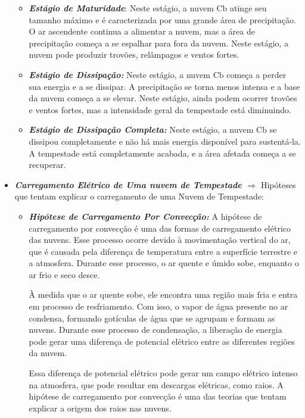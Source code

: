\documentclass[a4paper, 12pt, onecolumn,singlespacing]{article}
\begin{document}
\begin{itemize}
\begin{itemize}
			\item \textbf{\textit{Estágio de Maturidade}}: Neste estágio, a nuvem Cb atinge seu tamanho máximo e é caracterizada por uma grande área de precipitação. O ar ascendente continua a alimentar a nuvem, mas a área de precipitação começa a se espalhar para fora da nuvem. Neste estágio, a nuvem pode produzir trovões, relâmpagos e ventos fortes.
			
			\item \textbf{\textit{Estágio de Dissipação:}} Neste estágio, a nuvem Cb começa a perder sua energia e a se dissipar. A precipitação se torna menos intensa e a base da nuvem começa a se elevar. Neste estágio, ainda podem ocorrer trovões e ventos fortes, mas a intensidade geral da tempestade está diminuindo.
			
			\item \textbf{\textit{Estágio de Dissipação Completa:}} Neste estágio, a nuvem Cb se dissipou completamente e não há mais energia disponível para sustentá-la. A tempestade está completamente acabada, e a área afetada começa a se recuperar.
		\end{itemize}
		\item \textbf{\textit{Carregamento Elétrico de Uma nuvem de Tempestade $\Rightarrow$ }} Hipóteses que tentam explicar o carregamento de uma Nuvem de Tempestade:
		
		\begin{itemize}
			\item \textbf{\textit{ Hipótese de Carregamento Por Convecção:}} A hipótese de carregamento por convecção é uma das formas de carregamento elétrico das nuvens. Esse processo ocorre devido à movimentação vertical do ar, que é causada pela diferença de temperatura entre a superfície terrestre e a atmosfera. Durante esse processo, o ar quente e úmido sobe, enquanto o ar frio e seco desce.
			
			À medida que o ar quente sobe, ele encontra uma região mais fria e entra em processo de resfriamento. Com isso, o vapor de água presente no ar condensa, formando gotículas de água que se agrupam e formam as nuvens. Durante esse processo de condensação, a liberação de energia pode gerar uma diferença de potencial elétrico entre as diferentes regiões da nuvem.
			
			Essa diferença de potencial elétrico pode gerar um campo elétrico intenso na atmosfera, que pode resultar em descargas elétricas, como raios. A hipótese de carregamento por convecção é uma das teorias que tentam explicar a origem dos raios nas nuvens.
			

\end{itemize}
\end{itemize}
\end{document}
